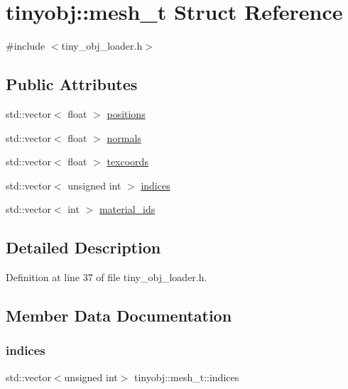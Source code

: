 \hypertarget{structtinyobj_1_1mesh__t}{}\section{tinyobj\+:\+:mesh\+\_\+t Struct Reference}
\label{structtinyobj_1_1mesh__t}


{\ttfamily \#include $<$tiny\+\_\+obj\+\_\+loader.\+h$>$}

\subsection*{Public Attributes}
\begin{DoxyCompactItemize}
\item 
std\+::vector$<$ float $>$ \hyperlink{structtinyobj_1_1mesh__t_a3014a27913256384aa283345b69ff2ec}{positions}
\item 
std\+::vector$<$ float $>$ \hyperlink{structtinyobj_1_1mesh__t_a28c2f7eb3114e6ed82a5b7326a4e7a1c}{normals}
\item 
std\+::vector$<$ float $>$ \hyperlink{structtinyobj_1_1mesh__t_a0fc485afc76bcd7e147b22285d7d6575}{texcoords}
\item 
std\+::vector$<$ unsigned int $>$ \hyperlink{structtinyobj_1_1mesh__t_aa0a07f40559a650e6917c506d78e298a}{indices}
\item 
std\+::vector$<$ int $>$ \hyperlink{structtinyobj_1_1mesh__t_a57b2f12dfa3fd620b25babcd3a09ec6b}{material\+\_\+ids}
\end{DoxyCompactItemize}


\subsection{Detailed Description}


Definition at line 37 of file tiny\+\_\+obj\+\_\+loader.\+h.



\subsection{Member Data Documentation}
\mbox{\label{structtinyobj_1_1mesh__t_aa0a07f40559a650e6917c506d78e298a}} 
\subsubsection{\texorpdfstring{indices}{indices}}
{\footnotesize\ttfamily std\+::vector$<$unsigned int$>$ tinyobj\+::mesh\+\_\+t\+::indices}



